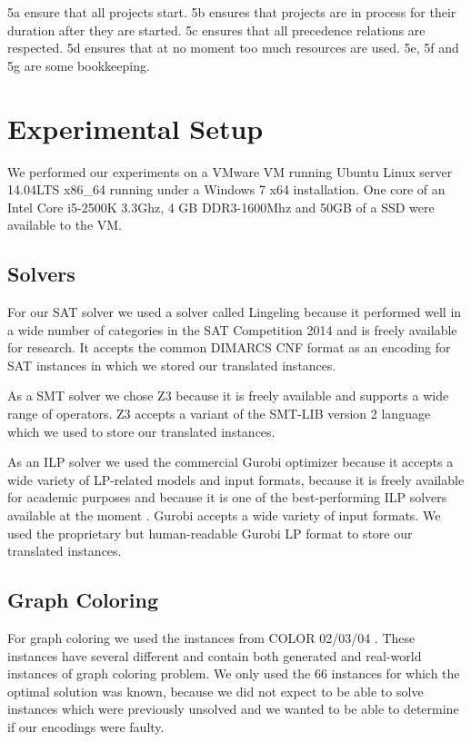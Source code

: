 \documentclass{sig-alternate}
\begin{document}
5a ensure that all projects start.
5b ensures that projects are in process for their duration after they are started.
5c ensures that all precedence relations are respected.
5d ensures that at no moment too much resources are used.
5e, 5f and 5g are some bookkeeping.

\section{Experimental Setup}

We performed our experiments on a VMware VM running Ubuntu Linux server 14.04LTS x86\_64  running under a Windows 7 x64 installation.
One core of an Intel Core i5-2500K 3.3Ghz, 4 GB DDR3-1600Mhz and 50GB of a SSD were available to the VM.

\subsection{Solvers}

For our SAT solver we used a solver called Lingeling \cite{solverLingeling} because it performed well in a wide number of categories in the SAT Competition 2014 \cite{comp2014sat} and is freely available for research.
It accepts the common DIMARCS CNF format \cite{challenge1993satisfiability} as an encoding for SAT instances in which we stored our translated instances.

As a SMT solver we chose Z3 \cite{de2008z3} because it is freely available and supports a wide range of operators.
Z3 accepts a variant of the SMT-LIB version 2 \cite{barrett2010smt} language which we used to store our translated instances.

As an ILP solver we used the commercial Gurobi optimizer \cite{gurobi} because it accepts a wide variety of LP-related models and input formats, because it is freely available for academic purposes and because it is one of the best-performing ILP solvers available at the moment \cite{meindl2012analysis}.
Gurobi accepts a wide variety of input formats.
We used the proprietary but human-readable Gurobi LP format to store our translated instances.

\subsection{Graph Coloring}

For graph coloring we used the instances from COLOR 02/03/04 \cite{color04}.
These instances have several different and contain both generated and real-world instances of graph coloring problem.
We only used the 66 instances for which the optimal solution was known, because we did not expect to be able to solve instances which were previously unsolved and we wanted to be able to determine if our encodings were faulty.
\end{document}
